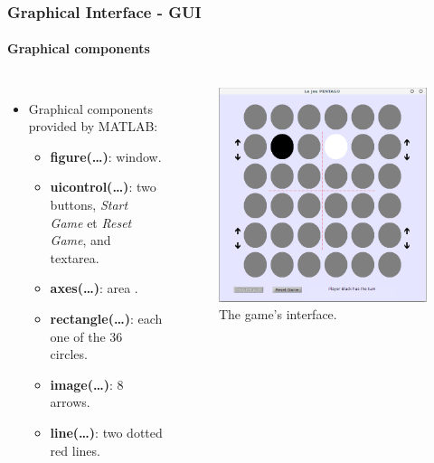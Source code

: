 \documentclass[10pt]{beamer}
\begin{document}

\begin{frame}

\frametitle{Graphical Interface - GUI}
\framesubtitle{Graphical components}
	\begin{columns}
		
		\begin{itemize}
		  \item Graphical components provided by MATLAB: 
		
			\begin{itemize}
			  \item \textbf{figure(\ldots)}: window.
			  \item \textbf{uicontrol(\ldots)}: two buttons, \textit{Start Game} et
			  \textit{Reset Game}, and textarea.
			  \item \textbf{axes(\ldots)}: area .
			  \item \textbf{rectangle(\ldots)}: each one of the 36 circles.
			  \item \textbf{image(\ldots)}: 8 arrows.
			  \item \textbf{line(\ldots)}:  two dotted red lines.
			\end{itemize}
	
		\end{itemize}
		
		\begin{figure}[h]
		\centering
		\includegraphics[scale=.25]{images/gui_jeu}
		\caption{The game's interface.}
		\label{fig:gui}
		\end{figure}

	\end{columns}

\end{frame}
\end{document}
